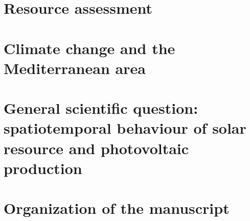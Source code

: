 \section{Resource assessment}
\section{Climate change and the Mediterranean area}
\section{General scientific question: spatiotemporal behaviour of solar resource and photovoltaic production}
\section{Organization of the manuscript}


